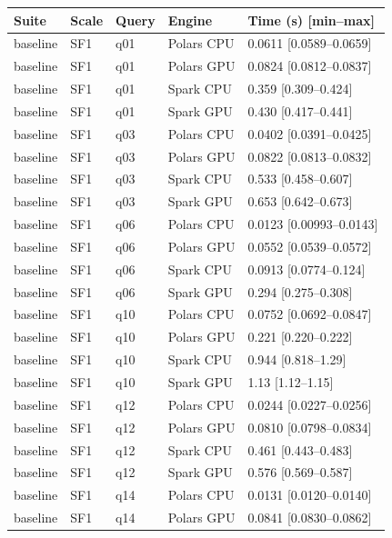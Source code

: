 \begin{longtable}{lllll}
\toprule
Suite & Scale & Query & Engine & Time (s) [min--max] \\
\midrule
\endhead
\bottomrule
\endfoot
baseline & SF1 & q01 & Polars CPU & 0.0611 [0.0589--0.0659] \\
baseline & SF1 & q01 & Polars GPU & 0.0824 [0.0812--0.0837] \\
baseline & SF1 & q01 & Spark CPU & 0.359 [0.309--0.424] \\
baseline & SF1 & q01 & Spark GPU & 0.430 [0.417--0.441] \\
baseline & SF1 & q03 & Polars CPU & 0.0402 [0.0391--0.0425] \\
baseline & SF1 & q03 & Polars GPU & 0.0822 [0.0813--0.0832] \\
baseline & SF1 & q03 & Spark CPU & 0.533 [0.458--0.607] \\
baseline & SF1 & q03 & Spark GPU & 0.653 [0.642--0.673] \\
baseline & SF1 & q06 & Polars CPU & 0.0123 [0.00993--0.0143] \\
baseline & SF1 & q06 & Polars GPU & 0.0552 [0.0539--0.0572] \\
baseline & SF1 & q06 & Spark CPU & 0.0913 [0.0774--0.124] \\
baseline & SF1 & q06 & Spark GPU & 0.294 [0.275--0.308] \\
baseline & SF1 & q10 & Polars CPU & 0.0752 [0.0692--0.0847] \\
baseline & SF1 & q10 & Polars GPU & 0.221 [0.220--0.222] \\
baseline & SF1 & q10 & Spark CPU & 0.944 [0.818--1.29] \\
baseline & SF1 & q10 & Spark GPU & 1.13 [1.12--1.15] \\
baseline & SF1 & q12 & Polars CPU & 0.0244 [0.0227--0.0256] \\
baseline & SF1 & q12 & Polars GPU & 0.0810 [0.0798--0.0834] \\
baseline & SF1 & q12 & Spark CPU & 0.461 [0.443--0.483] \\
baseline & SF1 & q12 & Spark GPU & 0.576 [0.569--0.587] \\
baseline & SF1 & q14 & Polars CPU & 0.0131 [0.0120--0.0140] \\
baseline & SF1 & q14 & Polars GPU & 0.0841 [0.0830--0.0862] \\

\end{longtable}
